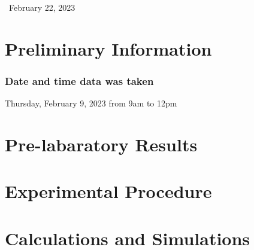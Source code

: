 \documentclass{article}
\begin{document}
\begin{titlepage}
		
		
		\vfill\vfill\vfill %
		
		{\large\ February 22, 2023 } %
		
		
		 
		
		\vfill %
		
	\end{titlepage}
	
	\section*{Preliminary Information}
		\subsubsection*{Date and time data was taken}
    		\tab Thursday, February 9, 2023 from 9am to 12pm
    
    \section*{Pre-labaratory Results}
 
 
    \pagebreak
    \section*{Experimental Procedure}


	\pagebreak
	\section*{Calculations and Simulations}
\end{document}
